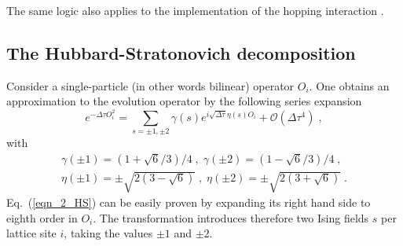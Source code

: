 The same logic also applies to the implementation of the hopping interaction .

\subsection{The Hubbard-Stratonovich decomposition} 
Consider a single-particle (in other words bilinear) operator $O_{i}$.
One obtains an approximation to the evolution operator by the following series expansion \cite{AssaadBook08}
\begin{equation}
\label{eqn_2_HS}
e^{-\Delta\tau O^{2}_{i} } = \sum\limits_{s=\pm1,\pm2} \gamma(s) e^{i \sqrt{\Delta\tau}\eta(s)O_{i}} + \mathcal{O}(\Delta\tau^{4})\;,
\end{equation}
with 
%
\begin{eqnarray}
\gamma(\pm 1) = (1+\sqrt{6}/3)/4\;,\;\gamma(\pm 2) = (1-\sqrt{6}/3)/4\;,\nonumber\\
\eta(\pm 1) =\pm \sqrt{2(3-\sqrt{6})}\;,\;\eta(\pm 2) =\pm \sqrt{2(3+\sqrt{6})}\;.
\end{eqnarray}
%
Eq.~(\ref{eqn_2_HS}) can be easily proven by expanding its right hand side  to eighth order in $O_{i}$. 
The transformation introduces therefore two Ising fields $s$ per lattice site $i$, taking the values $\pm 1$ and $\pm 2$.
